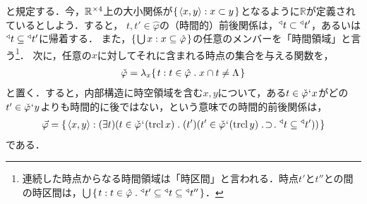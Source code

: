 と規定する．今，$ \mathbb{R}^{\times 4} $上の大小関係が$ \{\mspace{2mu}\langle x,y \rangle:x\subset y\mspace{2mu}\} $となるように$\mathbb{R}$が定義されているとしよう．すると，
$t,t'\in\hat{\varphi}$の（時間的）前後関係は，$ {^\triangleleft}t\subset{^\triangleleft}t' $，あるいは$ {^\triangleleft}t\subseteq{^\triangleleft}t' $に帰着する．
また，$ \{\mspace{2mu}{\textstyle\bigcup}\mspace{3mu}x:x\subseteq\hat\varphi\mspace{2mu}\} $の任意のメンバーを「時間領域」と言う\footnote{連続した時点からなる時間領域は「時区間」と言われる．時点$t'$と$t''$との間の時区間は，$ \union{\classab{t:t\in\hat{\varphi}\con{1}\trgl{t'}\subseteq \trgl{t}\subseteq \trgl{t''}}} $．}．
次に，任意の$ x $に対してそれに含まれる時点の集合を与える関数を，
\begin{align*}
    \check{\varphi} =  \lambda_x\classab{t:t\in\hat{\varphi}\con{1}x\cap t\neq\Lambda}
\end{align*}
と置く．すると，内部構造に時空領域を含む$x,y$について，ある$t\in\check{\varphi}{\mspace{1mu}{`}\mspace{1mu}} x$がどの$t'\in\check{\varphi}{\mspace{1mu}{`}\mspace{1mu}} y$よりも時間的に後ではない，という意味での時間的前後関係は，
\begin{align*}
    \vec{\varphi} = \classab{\orp{x,y}:
    (\exists t)(t\in\check{\varphi}\fap(\trcl x)\con{1}
    (t')(t'\in\check{\varphi}\fap(\trcl y)\case{1}{1}{1}\trgl{t}\subseteq\trgl{t'}))
    }
\end{align*}
である．

